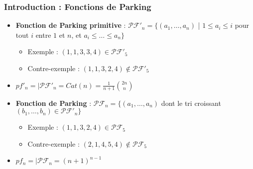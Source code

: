 \documentclass{beamer}
\begin{document}
\begin{frame}
    \frametitle{Introduction : Fonctions de Parking}
    \begin{itemize}
        \item \textbf{Fonction de Parking primitive} : $\mathcal{PF'}_n =
            \{(a_1, \ldots, a_n)$ | $1 \leqslant a_i \leqslant i$ pour tout
            $i$ entre $1$ et $n$, et $a_i \leqslant \ldots \leqslant a_n\}$
        \begin{itemize}
            \item Exemple : $(1, 1, 3, 3, 4) \in \mathcal{PF'}_5$
            \item Contre-exemple : $(1, 1, 3, 2, 4) \not \in \mathcal{PF'}_5$
        \end{itemize}
        \item $\displaystyle pf'_n = |\mathcal{PF'}_n = Cat(n) =
            \frac{1}{n+1}\binom{2n}{n}$
        \item \textbf{Fonction de Parking} : $\mathcal{PF}_n = \{(a_1,
            \ldots, a_n)$ dont le tri croissant $(b_1, \ldots, b_n) \in
            \mathcal{PF'}_n\}$
        \begin{itemize}
            \item Exemple : $(1, 1, 3, 2, 4) \in \mathcal{PF}_5$
            \item Contre-exemple : $(2, 1, 4, 5, 4) \not \in \mathcal{PF}_5$
        \end{itemize}
        \item $\displaystyle pf_n = |\mathcal{PF}_n = (n+1)^{n-1}$
    \end{itemize}
\end{frame}
\end{document}
